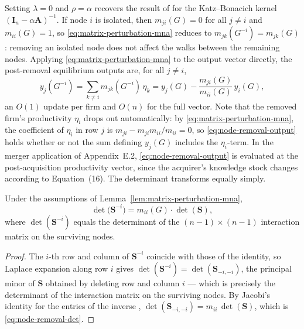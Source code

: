 Setting $\lambda = 0$ and $\rho = \alpha$ recovers the result of
\citet{ballester06:_who_networ} for the Katz--Bonacich kernel
$(\mathbf{I}_n - \alpha \mathbf{A})^{-1}$. If node $i$ is isolated, then
$m_{ji}(G) = 0$ for all $j \neq i$ and $m_{ii}(G) = 1$, so
\eqref{eq:matrix-perturbation-mna} reduces to $m_{jk}(G^{-i}) =
m_{jk}(G)$: removing an isolated node does not affect the walks between
the remaining nodes. Applying \eqref{eq:matrix-perturbation-mna} to the
output vector directly, the post-removal equilibrium outputs are, for
all $j \neq i$,
\begin{equation}
y_j(G^{-i})
=
\sum_{k \neq i} m_{jk}(G^{-i})\, \eta_k
=
y_j(G) - \frac{m_{ji}(G)}{m_{ii}(G)}\, y_i(G),
\label{eq:node-removal-output}
\end{equation}
an $O(1)$ update per firm and $O(n)$ for the full vector. Note that the
removed firm's productivity $\eta_i$ drops out automatically: by
\eqref{eq:matrix-perturbation-mna}, the coefficient of $\eta_i$ in row
$j$ is $m_{ji} - m_{ji} m_{ii} / m_{ii} = 0$, so
\eqref{eq:node-removal-output} holds whether or not the sum defining
$y_j(G)$ includes the $\eta_i$-term. In the merger application of
Appendix~E.2, \eqref{eq:node-removal-output} is evaluated at the
post-acquisition productivity vector, since the acquirer's knowledge
stock changes according to Equation~(16). The determinant transforms
equally simply.

\begin{corollary}
Under the assumptions of Lemma~\ref{lem:matrix-perturbation-mna},
\begin{equation}
\det \bigl( \mathbf{S}^{-i} \bigr)
=
m_{ii}(G) \cdot \det ( \mathbf{S} ),
\label{eq:node-removal-det}
\end{equation}
where $\det(\mathbf{S}^{-i})$ equals the determinant of the
$(n-1) \times (n-1)$ interaction matrix on the surviving nodes.
\label{cor:matrix-perturbation-det}
\end{corollary}

\begin{proof}
The $i$-th row and column of $\mathbf{S}^{-i}$ coincide with those of
the identity, so Laplace expansion along row $i$ gives
$\det(\mathbf{S}^{-i}) = \det(\mathbf{S}_{-i,-i})$, the principal minor
of $\mathbf{S}$ obtained by deleting row and column $i$ --- which is
precisely the determinant of the interaction matrix on the surviving
nodes. By Jacobi's identity for the entries of the inverse
\citep[cf.][]{horn90:_matrix_analy}, $\det(\mathbf{S}_{-i,-i}) =
m_{ii}\, \det(\mathbf{S})$, which is \eqref{eq:node-removal-det}.
\end{proof}

